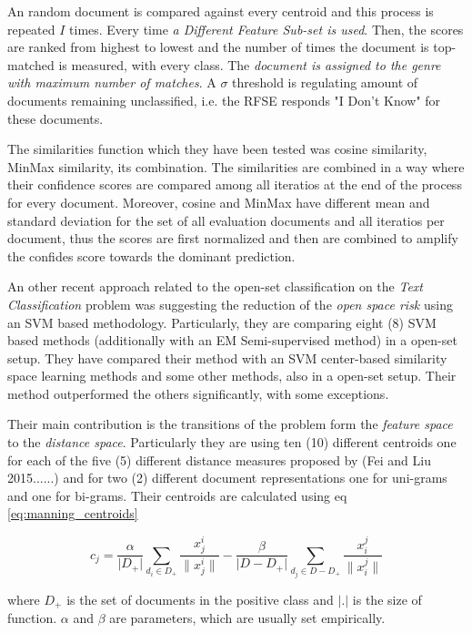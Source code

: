 An random document is compared against every centroid and this process is repeated $I$ times. Every time \textit{a Different Feature Sub-set is used}. Then, the scores are ranked from highest to lowest and the number of times the document is top-matched is measured, with every class. The \textit{document is assigned to the genre with maximum number of matches}. A $\sigma$ threshold is regulating amount of documents remaining unclassified, i.e. the RFSE responds "I Don't Know" for these documents.

The similarities function which they have been tested was cosine similarity, MinMax similarity, its combination. The similarities are combined in a way where their confidence scores are compared among all iteratios at the end of the process for every document. Moreover, cosine and MinMax have different mean and standard deviation for the set of all evaluation documents and all iteratios per document, thus the scores are first normalized and then are combined to amplify the confides score towards the dominant prediction.

An other recent approach related to the open-set classification on the \textit{Text Classification} problem was suggesting the reduction of the \textit{open space risk} using an SVM based methodology. Particularly, they are comparing eight (8) SVM based methods (additionally with an EM Semi-supervised method) in a open-set setup. They have compared their method with an  SVM center-based similarity space learning methods and some other methods, also in a open-set setup. Their method outperformed the others significantly, with some exceptions. 

Their main contribution is the transitions of the problem form the \textit{feature space} to the \textit{distance space}. Particularly they are using ten (10) different centroids one for each of the five (5) different distance measures proposed by (Fei and Liu 2015......) and for two (2) different document representations one for uni-grams and one for bi-grams. Their centroids are calculated using  eq \ref{eq:manning_centroids} 

\begin{equation}\label{eq:manning_centroids}
	c_{j} = \frac{\alpha}{\lvert D_{+} \rvert} \sum_{d_{i} \in D_{+}} \frac{x_{j}^{i}}{\lVert x_{j}^{i} \rVert } - \frac{\beta}{\lvert D - D_{+} \rvert} \sum_{d_{j} \in D - D_{+}} \frac{x_{i}^{j}}{\lVert x_{i}^{j} \rVert}
\end{equation}

where $D_{+}$ is the set of documents in the positive class and $\lvert . \rvert$ is the size of function. $\alpha$ and $\beta$ are parameters, which are usually set empirically.

